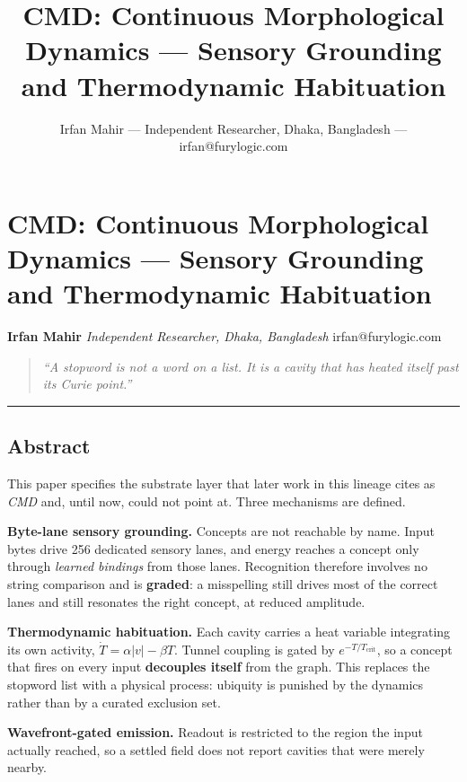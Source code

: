 \documentclass[
  11pt,
  a4paper,
]{article}
\title{CMD: Continuous Morphological Dynamics --- Sensory Grounding and
Thermodynamic Habituation}
\author{Irfan Mahir --- Independent Researcher, Dhaka, Bangladesh ---
irfan@furylogic.com}
\date{}
\begin{document}
\maketitle

{
\hypersetup{linkcolor=}
\setcounter{tocdepth}{3}
\tableofcontents
}
\section{CMD: Continuous Morphological Dynamics --- Sensory Grounding
and Thermodynamic
Habituation}\label{cmd-continuous-morphological-dynamics-sensory-grounding-and-thermodynamic-habituation}

\textbf{Irfan Mahir} \emph{Independent Researcher, Dhaka, Bangladesh}
irfan@furylogic.com

\begin{quote}
\emph{``A stopword is not a word on a list. It is a cavity that has
heated itself past its Curie point.''}
\end{quote}

\begin{center}\rule{0.5\linewidth}{0.5pt}\end{center}

\subsection{Abstract}\label{abstract}

This paper specifies the substrate layer that later work in this lineage
cites as \emph{CMD} and, until now, could not point at. Three mechanisms
are defined.

\textbf{Byte-lane sensory grounding.} Concepts are not reachable by
name. Input bytes drive 256 dedicated sensory lanes, and energy reaches
a concept only through \emph{learned bindings} from those lanes.
Recognition therefore involves no string comparison and is
\textbf{graded}: a misspelling still drives most of the correct lanes
and still resonates the right concept, at reduced amplitude.

\textbf{Thermodynamic habituation.} Each cavity carries a heat variable
integrating its own activity, \(\dot{T} = \alpha|v| - \beta T\). Tunnel
coupling is gated by \(e^{-T/T_{\text{crit}}}\), so a concept that fires
on every input \textbf{decouples itself} from the graph. This replaces
the stopword list with a physical process: ubiquity is punished by the
dynamics rather than by a curated exclusion set.

\textbf{Wavefront-gated emission.} Readout is restricted to the region
the input actually reached, so a settled field does not report cavities
that were merely nearby.
\end{document}
